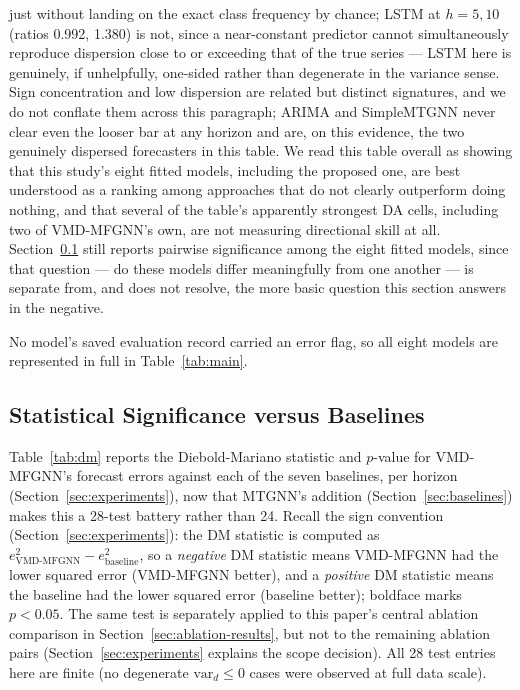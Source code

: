 \documentclass[journal]{IEEEtran}
\begin{document}
just without landing on the exact class frequency by chance; LSTM at $h=5,10$ (ratios 0.992, 1.380) is not, since a near-constant predictor cannot simultaneously reproduce dispersion close to or exceeding that of the true series --- LSTM here is genuinely, if unhelpfully, one-sided rather than degenerate in the variance sense. Sign concentration and low dispersion are related but distinct signatures, and we do not conflate them across this paragraph; ARIMA and SimpleMTGNN never clear even the looser bar at any horizon and are, on this evidence, the two genuinely dispersed forecasters in this table. We read this table overall as showing that this study's eight fitted models, including the proposed one, are best understood as a ranking among approaches that do not clearly outperform doing nothing, and that several of the table's apparently strongest DA cells, including two of VMD-MFGNN's own, are not measuring directional skill at all. Section~\ref{sec:results-dm} still reports pairwise significance among the eight fitted models, since that question --- do these models differ meaningfully from one another --- is separate from, and does not resolve, the more basic question this section answers in the negative.

No model's saved evaluation record carried an error flag, so all eight models are represented in full in Table~\ref{tab:main}.

\subsection{Statistical Significance versus Baselines}
\label{sec:results-dm}

Table~\ref{tab:dm} reports the Diebold-Mariano statistic and $p$-value for VMD-MFGNN's forecast errors against each of the seven baselines, per horizon (Section~\ref{sec:experiments}), now that MTGNN's addition (Section~\ref{sec:baselines}) makes this a 28-test battery rather than 24. Recall the sign convention (Section~\ref{sec:experiments}): the DM statistic is computed as $e_{\text{VMD-MFGNN}}^2 - e_{\text{baseline}}^2$, so a \emph{negative} DM statistic means VMD-MFGNN had the lower squared error (VMD-MFGNN better), and a \emph{positive} DM statistic means the baseline had the lower squared error (baseline better); boldface marks $p<0.05$. The same test is separately applied to this paper's central ablation comparison in Section~\ref{sec:ablation-results}, but not to the remaining ablation pairs (Section~\ref{sec:experiments} explains the scope decision). All 28 test entries here are finite (no degenerate $\mathrm{var}_d \le 0$ cases were observed at full data scale).
\end{document}
